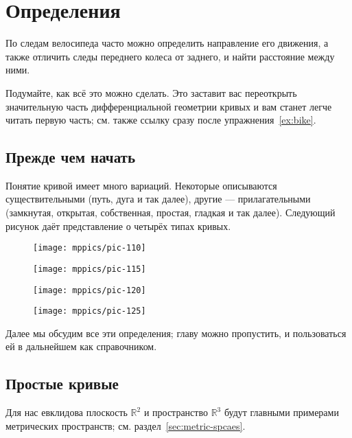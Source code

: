 \chapter{Определения}
\label{chap:curves-def}

По следам велосипеда часто можно определить направление его движения, а также отличить следы переднего колеса от заднего, и найти расстояние между ними.

Подумайте, как всё это можно сделать.
Это заставит вас переоткрыть значительную часть дифференциальной геометрии кривых и вам станет легче читать первую часть;
см. также ссылку сразу после упражнения~\ref{ex:bike}.

\section{Прежде чем начать}

Понятие кривой имеет много вариаций.
Некоторые описываются существительными (путь, дуга и так далее), 
другие --- прилагательными (замкнутая, открытая, собственная, простая, гладкая и так далее).
Следующий рисунок даёт представление о четырёх типах кривых.

\vskip-0mm
\begin{figure}[h!]
\begin{minipage}{.48\textwidth}
\centering
\texttt{[image: mppics/pic-110]}
\end{minipage}\hfill
\begin{minipage}{.48\textwidth}
\centering
\texttt{[image: mppics/pic-115]}
\end{minipage}
\bigskip
\begin{minipage}{.48\textwidth}
\centering
\texttt{[image: mppics/pic-120]}
\end{minipage}\hfill
\begin{minipage}{.48\textwidth}
\centering
\texttt{[image: mppics/pic-125]}
\end{minipage}
\end{figure}
\vskip-0mm

Далее мы обсудим все эти определения;
главу можно пропустить, и пользоваться ей в дальнейшем как справочником.

\section{Простые кривые}

Для нас евклидова плоскость $\mathbb{R}^2$ и пространство $\mathbb{R}^3$ будут главными примерами метрических пространств; см. раздел~\ref{sec:metric-spcaes}.

